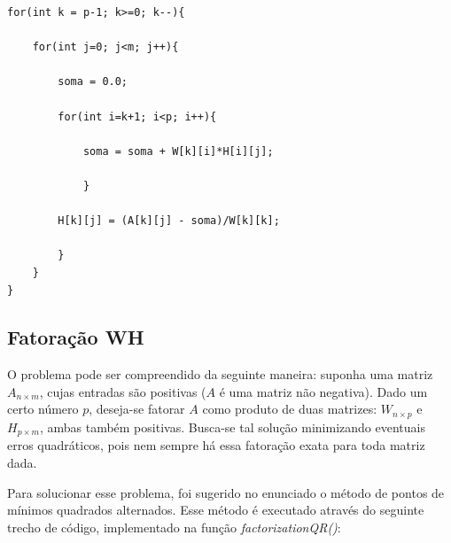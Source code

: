 \documentclass[twocolumn,amsmath,amssymb,floatfix]{revtex4}
\begin{document}
\begin{lstlisting}
for(int k = p-1; k>=0; k--){

	for(int j=0; j<m; j++){

		soma = 0.0;

		for(int i=k+1; i<p; i++){

			soma = soma + W[k][i]*H[i][j];

			}

		H[k][j] = (A[k][j] - soma)/W[k][k];

		}
  	}
}
\end{lstlisting}

\subsection{Fatoração WH}

O problema pode ser compreendido da seguinte maneira: suponha uma matriz $A_{n \times m}$, cujas entradas são positivas ($A$ é uma matriz não negativa). Dado um certo número $p$, deseja-se fatorar $A$ como produto de duas matrizes: $W_{n \times p}$ e $H_{p \times m}$, ambas também positivas. Busca-se tal solução minimizando eventuais erros quadráticos, pois nem sempre há essa fatoração exata para toda matriz dada.

Para solucionar esse problema, foi sugerido no enunciado o método de pontos de mínimos quadrados alternados. Esse método é executado através do seguinte trecho de código, implementado na função \textit{factorizationQR()}:
\end{document}

